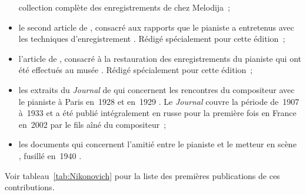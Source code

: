 \begin{itemize}
 collection complète des enregistrements de \Sofronitsky{} chez Melodija~;
 \item
 le second article de \PLobanov{}, consacré aux rapports que le pianiste a
 entretenus avec les techniques d'enregistrement \citep{Lobanov08b}.
 Rédigé spécialement pour cette édition~;
 \item
 l'article de \TBadeyan{}, consacré à la restauration des enregistrements du
 pianiste qui ont été effectués au musée \Scriabine{} \citep{Badeyan08}.
 Rédigé spécialement pour cette édition~;
 \item
 les extraits du \emph{Journal} de \SProkofiev{} qui concernent les
 rencontres du compositeur avec le pianiste à Paris en~1928 et en~1929
 \citep{Prokofiev08}.
 Le \emph{Journal} couvre la période de~1907 à~1933 et a été publié
 intégralement en russe pour la première fois en France en~2002 par le fils
 aîné du compositeur~;
 \item
 les documents qui concernent l'amitié entre le pianiste et le metteur en
 scène \VMeyerhold{}, fusillé en~1940 \citep{NikonovichScriabine08}.
\end{itemize}

Voir tableau~\ref{tab:Nikonovich} pour la liste des premières publications
de ces contributions.

